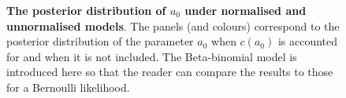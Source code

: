 \documentclass[a4paper, notitlepage, 11pt]{article}
\begin{document}
\begin{figure}
\hfill
{}
\hfill
\caption{\textbf{The posterior distribution of $a_0$ under normalised and unnormalised models}.
The panels (and colours) correspond to the posterior distribution of the parameter $a_0$ when $c(a_0)$ is accounted for and when it is not included.
The Beta-binomial model is introduced here so that the reader can compare the results to those for a Bernoulli likelihood.
}
\label{fig:normalisation}
\end{figure}
\end{document}
